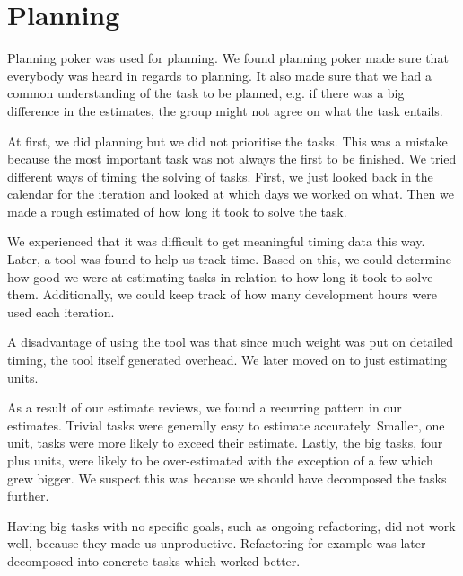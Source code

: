 \section{Planning}
Planning poker was used for planning. We found planning poker made sure that everybody was heard in regards to planning. It also made sure that we had a common understanding of the task to be planned, e.g. if there was a big difference in the estimates, the group might not agree on what the task entails.

At first, we did planning but we did not prioritise the tasks. This was a mistake because the most important task was not always the first to be finished. We tried different ways of timing the solving of tasks. First, we just looked back in the calendar for the iteration and looked at which days we worked on what. Then we made a rough estimated of how long it took to solve the task. 

We experienced that it was difficult to get meaningful timing data this way. Later, a tool was found to help us track time. Based on this, we could determine how good we were at estimating tasks in relation to how long it took to solve them. Additionally, we could keep track of how many development hours were used each iteration. 

A disadvantage of using the tool was that since much weight was put on detailed timing, the tool itself generated overhead. We later moved on to just estimating units.

As a result of our estimate reviews, we found a recurring pattern in our estimates. Trivial tasks were generally easy to estimate accurately. Smaller, one unit, tasks were more likely to exceed their estimate. Lastly, the big tasks, four plus units, were likely to be over-estimated with the exception of a few which grew bigger. We suspect this was because we should have decomposed the tasks further.

Having big tasks with no specific goals, such as ongoing refactoring, did not work well, because they made us unproductive. Refactoring for example was later decomposed into concrete tasks which worked better.

